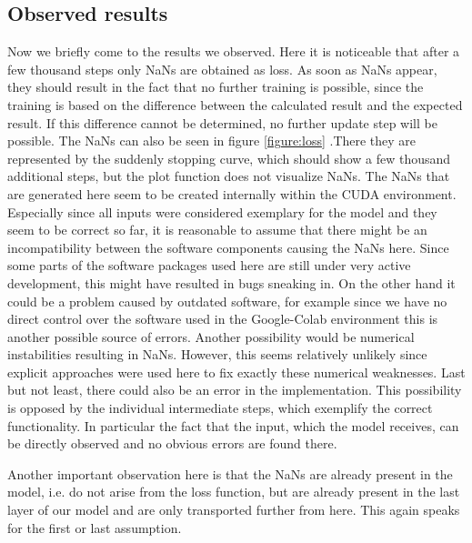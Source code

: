 \subsection{Observed results}
Now we briefly come to the results we observed. Here it is noticeable that after a few thousand steps only NaNs are obtained as loss. As soon as NaNs appear, they should result in the fact that no further training is possible, since the training is based on the difference between the calculated result and the expected result. If this difference cannot be determined, no further update step will be possible. The NaNs can also be seen in figure \ref{figure:loss} .There they are represented by the suddenly stopping curve, which should show a few thousand additional steps, but the plot function does not visualize NaNs.
The NaNs that are generated here seem to be created internally within the CUDA environment. Especially since all inputs were considered exemplary for the model and they seem to be correct so far, it is reasonable to assume that there might be an incompatibility between the software components causing the NaNs here. Since some parts of the software packages used here are still under very active development, this might have resulted in bugs sneaking in. On the other hand it could be a problem caused by outdated software, for example since we have no direct control over the software used in the Google-Colab environment this is another possible source of errors. Another possibility would be numerical instabilities resulting in NaNs. However, this seems relatively unlikely since explicit approaches were used here to fix exactly these numerical weaknesses. Last but not least, there could also be an error in the implementation. This possibility is opposed by the individual intermediate steps, which exemplify the correct functionality. In particular the fact that the input, which the model receives, can be directly observed and no obvious errors are found there.

Another important observation here is that the NaNs are already present in the model, i.e. do not arise from the loss function, but are already present in the last layer of our model and are only transported further from here. This again speaks for the first or last assumption.


